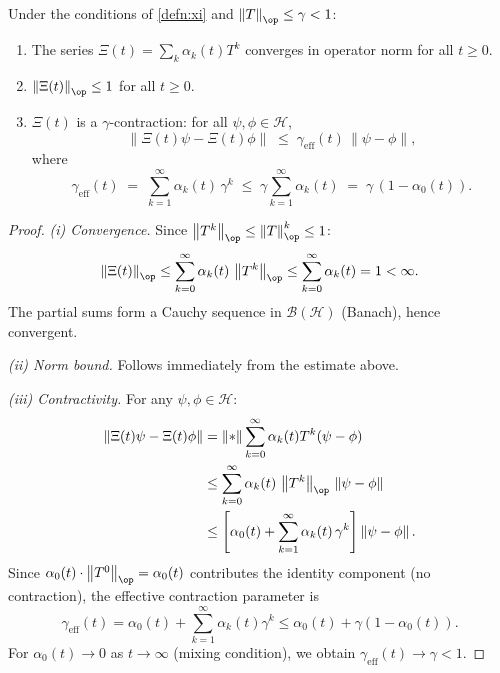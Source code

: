 \documentclass[12pt,letterpaper]{article}
\theoremstyle{definition}
\theoremstyle{remark}
\newcommand{\HH}{\mathcal{H}}
\newcommand{\norm}[1]{\left\|#1\right\|}
\begin{document}
\begin{apptheorem}
\label{thm:xi-contraction}
Under the conditions of \cref{defn:xi} and $\norm{T}_{\op} \leq \gamma < 1$:
\begin{enumerate}[label=(\roman*)]
  \item The series $\Xi(t) = \sum_k \alpha_k(t) T^k$ converges in operator
        norm for all $t \geq 0$.
  \item $\norm{\Xi(t)}_{\op} \leq 1$ for all $t \geq 0$.
  \item $\Xi(t)$ is a $\gamma$-contraction: for all $\psi, \phi \in \HH$,
        \[
          \norm{\Xi(t)\psi - \Xi(t)\phi}
          \;\leq\; \gamma_{\mathrm{eff}}(t)\,\norm{\psi - \phi},
        \]
        where
        \[
          \gamma_{\mathrm{eff}}(t)
          \;=\;
          \sum_{k=1}^{\infty} \alpha_k(t)\, \gamma^k
          \;\leq\;
          \gamma \sum_{k=1}^{\infty} \alpha_k(t)
          \;=\;
          \gamma\,(1 - \alpha_0(t)).
        \]
\end{enumerate}
\end{apptheorem}

\begin{proof}
\textit{(i) Convergence.}
Since $\norm{T^k}_{\op} \leq \norm{T}_{\op}^k \leq 1$:
\[
  \norm{\Xi(t)}_{\op}
  \leq \sum_{k=0}^\infty \alpha_k(t)\,\norm{T^k}_{\op}
  \leq \sum_{k=0}^\infty \alpha_k(t) = 1 < \infty.
\]
The partial sums form a Cauchy sequence in $\mathcal{B}(\HH)$ (Banach), hence
convergent.

\textit{(ii) Norm bound.}
Follows immediately from the estimate above.

\textit{(iii) Contractivity.}
For any $\psi, \phi \in \HH$:
\begin{align}
  \norm{\Xi(t)\psi - \Xi(t)\phi}
  &= \norm*{\sum_{k=0}^\infty \alpha_k(t) T^k (\psi - \phi)} \notag\\
  &\leq \sum_{k=0}^\infty \alpha_k(t)\,\norm{T^k}_{\op}\,\norm{\psi - \phi}
  \notag\\
  &\leq \left[\alpha_0(t) + \sum_{k=1}^\infty \alpha_k(t)\,\gamma^k \right]
    \norm{\psi - \phi}.
\end{align}
Since $\alpha_0(t) \cdot \norm{T^0}_{\op} = \alpha_0(t)$ contributes the
identity component (no contraction), the effective contraction parameter is
\[
  \gamma_{\mathrm{eff}}(t)
  = \alpha_0(t) + \sum_{k=1}^\infty \alpha_k(t)\gamma^k
  \leq \alpha_0(t) + \gamma(1 - \alpha_0(t)).
\]
For $\alpha_0(t) \to 0$ as $t \to \infty$ (mixing condition), we obtain
$\gamma_{\mathrm{eff}}(t) \to \gamma < 1$.
\end{proof}
\end{document}
